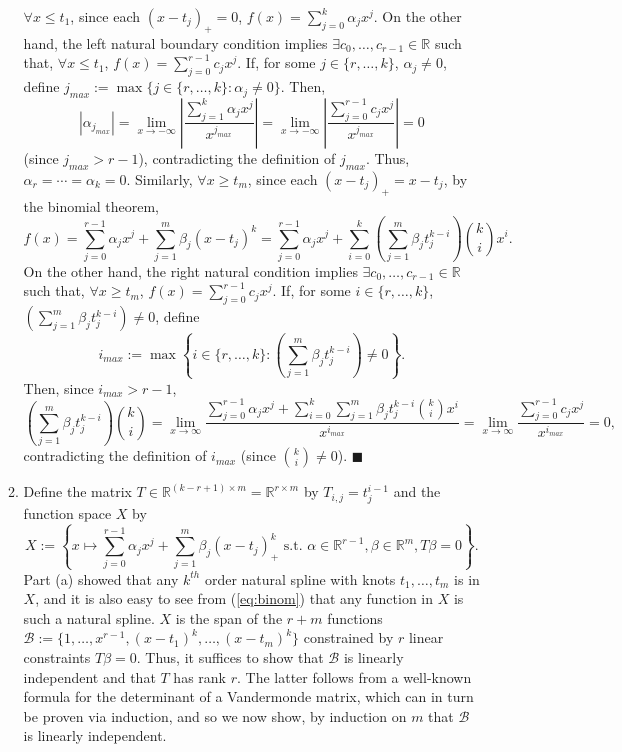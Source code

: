 \documentclass[11pt]{article}
\renewcommand{\qed}{\quad \ensuremath{\blacksquare}}
\newcommand{\R}{\mathbb{R}} %
\newcommand{\B}{\mathcal{B}}
\begin{document}
\begin{enumerate}
\begin{enumerate}
$\forall x \leq t_1$, since each $(x - t_j)_+ = 0$,
$f(x) = \sum_{j = 0}^k \alpha_j x^j$. On the other hand, the left natural
boundary condition implies $\exists c_0,\dots,c_{r - 1} \in \R$ such that,
$\forall x \leq t_1$, $f(x) = \sum_{j = 0}^{r - 1} c_j x^j$. If, for some
$j \in \{r,\dots,k\}$, $\alpha_j \neq 0$, define
$j_{max} := \max \{j \in \{r,\dots,k\} : \alpha_j \neq 0\}$. Then,
\[|\alpha_{j_{max}}|
    = \lim_{x \to -\infty}
                \left| \frac{\sum_{j = 1}^k \alpha_j x^j}{x^{j_{max}}} \right|
    = \lim_{x \to -\infty}
                \left| \frac{\sum_{j = 0}^{r - 1} c_j x^j}{x^{j_{max}}} \right|
    = 0\]
(since $j_{max} > r - 1$), contradicting the definition of $j_{max}$. Thus,
$\alpha_r = \cdots = \alpha_k = 0$. Similarly, $\forall x \geq t_m$, since each
$(x - t_j)_+ = x - t_j$, by the binomial theorem,
\begin{equation}
f(x)
    = \sum_{j = 0}^{r - 1} \alpha_j x^j + \sum_{j = 1}^m \beta_j(x - t_j)^k
    = \sum_{j = 0}^{r - 1} \alpha_j x^j
        + \sum_{i = 0}^k
        \left( \sum_{j = 1}^m \beta_j t_j^{k - i} \right) \binom{k}{i} x^i.
\label{eq:binom}
\end{equation}
On the other hand, the right natural condition implies
$\exists c_0,\dots,c_{r - 1} \in \R$ such that, $\forall x \geq t_m$,
$f(x) = \sum_{j = 0}^{r - 1} c_j x^j$. If, for some
$i \in \{r,\dots,k\}$,
$\left( \sum_{j = 1}^m \beta_j t_j^{k - i} \right) \neq 0$, define
\[i_{max}
    := \max \left\{i \in \{r,\dots,k\}
        : \left( \sum_{j = 1}^m \beta_j t_j^{k - i} \right) \neq 0 \right\}.\]
Then, since $i_{max} > r - 1$,
\[\left( \sum_{j = 1}^m \beta_j t_j^{k - i} \right) \binom{k}{i}
    = \lim_{x \to \infty} \frac{\sum_{j = 0}^{r - 1} \alpha_j x^j
        + \sum_{i = 0}^k \sum_{j = 1}^m \beta_j t_j^{k - i} \binom{k}{i} x^i}
        {x^{i_{max}}}
    = \lim_{x \to \infty} \frac{\sum_{j = 0}^{r - 1} c_j x^j}{x^{i_{max}}}
    = 0,
\]
contradicting the definition of $i_{max}$ (since $\binom{k}{i} \neq 0$). \qed

\item Define the matrix $T \in \R^{(k - r + 1) \times m} = \R^{r \times m}$ by
$T_{i,j} = t_j^{i - 1}$ and the function space $X$ by
\[X
    := \left\{ x \mapsto
        \sum_{j = 0}^{r - 1} \alpha_j x^j + \sum_{j = 1}^m \beta_j(x - t_j)_+^k
        \mbox{ s.t. }
        \alpha \in \R^{r - 1}, \beta \in \R^m,
        T\beta = 0
    \right\}.\]
Part (a) showed that any $k^{th}$ order natural spline with knots
$t_1,\dots,t_m$ is in $X$, and it is also easy to see from (\ref{eq:binom})
that any function in $X$ is such a natural spline. $X$ is the span of the
$r + m$ functions $\B := \{1,\dots,x^{r - 1},(x - t_1)^k,\dots,(x - t_m)^k\}$
constrained by $r$ linear constraints $T\beta = 0$. Thus, it suffices to show
that $\B$ is linearly independent and that $T$ has rank $r$. The latter follows
from a well-known formula for the determinant of a Vandermonde matrix, which
can in turn be proven via induction, and so we now show, by induction on $m$
that $\B$ is linearly independent.


\end{enumerate}
\end{enumerate}
\end{document}
